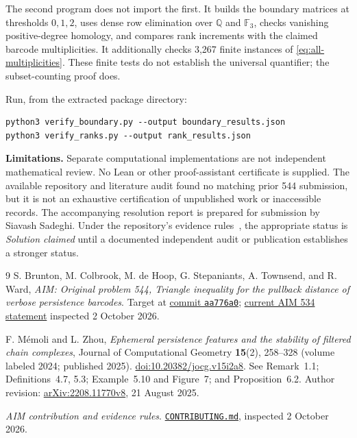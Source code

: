 \documentclass[11pt]{article}
\theoremstyle{remark}
\begin{document}
The second program does not import the first. It builds the boundary
matrices at thresholds $0,1,2$, uses dense row elimination over
$\mathbb Q$ and $\mathbb F_3$, checks vanishing positive-degree homology,
and compares rank increments with the claimed barcode multiplicities.
It additionally checks 3,267 finite instances of
\eqref{eq:all-multiplicities}. These finite tests do not establish the
universal quantifier; the subset-counting proof does.

Run, from the extracted package directory:
\begin{verbatim}
python3 verify_boundary.py --output boundary_results.json
python3 verify_ranks.py --output rank_results.json
\end{verbatim}

\textbf{Limitations.} Separate computational implementations are not
independent mathematical review. No Lean or other proof-assistant
certificate is supplied. The available repository and literature audit
found no matching prior 544 submission, but it is not an exhaustive
certification of unpublished work or inaccessible records. The accompanying resolution report is prepared for submission by
Siavash Sadeghi. Under the repository's evidence rules~\cite{contributing},
the appropriate status is \emph{Solution claimed} until a documented
independent audit or publication establishes a stronger status.

\begin{thebibliography}{9}
S. Brunton, M. Colbrook, M. de Hoop, G. Stepaniants, A. Townsend, and R. Ward,
\emph{AIM: Original problem 544, Triangle inequality for the pullback
distance of verbose persistence barcodes}. Target at
\href{https://github.com/MColbrook/AIM/blob/aa776a01d7d48a79f93251af11fde9454b0aea95/problems/544-verbose-persistence-pullback-triangle.md}{commit \texttt{aa776a0}};
\href{https://github.com/MColbrook/AIM/blob/fa98b7525fa3f78317536a8825f9cfa0ae1c369c/problems/534-verbose-persistence-pullback-triangle.md}{current AIM 534 statement}
inspected 2 October 2026.

F. M\'emoli and L. Zhou,
\emph{Ephemeral persistence features and the stability of filtered chain complexes},
Journal of Computational Geometry \textbf{15}(2), 258--328
(volume labeled 2024; published 2025).
\href{https://doi.org/10.20382/jocg.v15i2a8}{doi:10.20382/jocg.v15i2a8}.
See Remark~1.1; Definitions~4.7, 5.3; Example~5.10 and Figure~7;
and Proposition~6.2. Author revision:
\href{https://arxiv.org/abs/2208.11770v8}{arXiv:2208.11770v8}, 21 August 2025.

\emph{AIM contribution and evidence rules}.
\href{https://github.com/MColbrook/AIM/blob/fa98b7525fa3f78317536a8825f9cfa0ae1c369c/CONTRIBUTING.md}{\texttt{CONTRIBUTING.md}},
inspected 2 October 2026.
\end{thebibliography}
\end{document}
